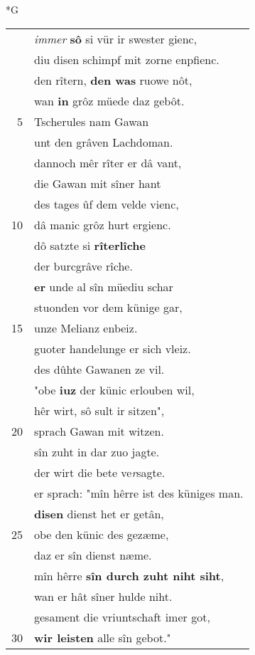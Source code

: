 \documentclass[8pt,a4paper,notitlepage]{article}
\begin{document}
\begin{table}[ht]
\begin{minipage}[t]{0.5\linewidth}
\small
\begin{center}*G
\end{center}
\begin{tabular}{rl}
 & \textit{immer} \textbf{sô} si vür ir swester gienc,\\ 
 & diu disen schimpf mit zorne enpfienc.\\ 
 & den rîtern, \textbf{den was} ruowe nôt,\\ 
 & wan \textbf{in} grôz müede daz gebôt.\\ 
5 & Tscherules nam Gawan\\ 
 & unt den grâven Lachdoman.\\ 
 & dannoch mêr rîter er dâ vant,\\ 
 & die Gawan mit sîner hant\\ 
 & des tages ûf dem velde vienc,\\ 
10 & dâ manic grôz hurt ergienc.\\ 
 & dô satzte si \textbf{rîterlîche}\\ 
 & der burcgrâve rîche.\\ 
 & \textbf{er} unde al sîn müediu schar\\ 
 & stuonden vor dem künige gar,\\ 
15 & unze Melianz enbeiz.\\ 
 & guoter handelunge er sich vleiz.\\ 
 & des dûhte Gawanen ze vil.\\ 
 & "obe \textbf{iuz} der künic erlouben wil,\\ 
 & hêr wirt, sô sult ir sitzen",\\ 
20 & sprach Gawan mit witzen.\\ 
 & sîn zuht in dar zuo jagte.\\ 
 & der wirt die bete ve\textit{r}sagte.\\ 
 & er sprach: "mîn hêrre ist des küniges man.\\ 
 & \textbf{disen} dienst het er getân,\\ 
25 & obe den künic des gezæme,\\ 
 & daz er sîn dienst næme.\\ 
 & mîn hêrre \textbf{sîn durch zuht niht siht},\\ 
 & wan er hât sîner hulde niht.\\ 
 & gesament die vriuntschaft imer got,\\ 
30 & \textbf{wir leisten} alle sîn gebot."\\ 

\end{tabular}
\end{minipage}
\end{table}
\end{document}
